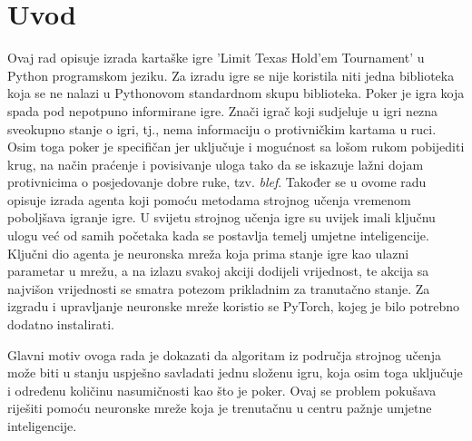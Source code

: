 \section{Uvod}
Ovaj rad opisuje izrada kartaške igre 'Limit Texas Hold'em Tournament' u Python programskom jeziku. Za izradu igre se nije koristila niti jedna biblioteka koja se ne nalazi u Pythonovom standardnom skupu biblioteka. Poker je igra koja spada pod nepotpuno informirane igre. Znači igrač koji sudjeluje u igri nezna sveokupno stanje o igri, tj., nema informaciju o protivničkim kartama u ruci. Osim toga poker je specifičan jer uključuje i mogućnost sa lošom rukom pobijediti krug, na način praćenje i povisivanje uloga tako da se iskazuje lažni dojam protivnicima o posjedovanje dobre ruke, tzv. \emph{blef}. Također se u ovome radu opisuje izrada agenta koji pomoću metodama strojnog učenja vremenom poboljšava igranje igre. U svijetu strojnog učenja igre su uvijek imali ključnu ulogu već od samih početaka kada se postavlja temelj umjetne inteligencije. Ključni dio agenta je neuronska mreža koja prima stanje igre kao ulazni parametar u mrežu, a na izlazu svakoj akciji dodijeli vrijednost, te akcija sa najvišon vrijednosti se smatra potezom prikladnim za tranutačno stanje. Za izgradu i upravljanje neuronske mreže koristio se PyTorch, kojeg je bilo potrebno dodatno instalirati. 

Glavni motiv ovoga rada je dokazati da algoritam iz područja strojnog učenja može biti u stanju uspješno savladati jednu složenu igru, koja osim toga uključuje i određenu količinu nasumičnosti kao što je poker. Ovaj se problem pokušava riješiti pomoću neuronske mreže koja je trenutačnu u centru pažnje umjetne inteligencije. 
